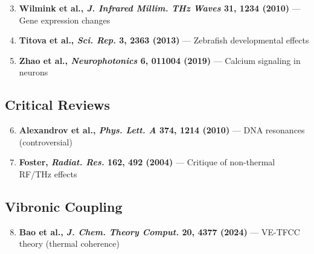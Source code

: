 \begin{enumerate}
\setcounter{enumi}{2}
\item \textbf{Wilmink et al., \emph{J. Infrared Millim. THz Waves} 31, 1234 (2010)} --- Gene expression changes
\item \textbf{Titova et al., \emph{Sci. Rep.} 3, 2363 (2013)} --- Zebrafish developmental effects
\item \textbf{Zhao et al., \emph{Neurophotonics} 6, 011004 (2019)} --- Calcium signaling in neurons
\end{enumerate}

\subsection{Critical Reviews}

\begin{enumerate}
\setcounter{enumi}{5}
\item \textbf{Alexandrov et al., \emph{Phys. Lett. A} 374, 1214 (2010)} --- DNA resonances (controversial)
\item \textbf{Foster, \emph{Radiat. Res.} 162, 492 (2004)} --- Critique of non-thermal RF/THz effects
\end{enumerate}

\subsection{Vibronic Coupling}

\begin{enumerate}
\setcounter{enumi}{7}
\item \textbf{Bao et al., \emph{J. Chem. Theory Comput.} 20, 4377 (2024)} --- VE-TFCC theory (thermal coherence)
\end{enumerate}
